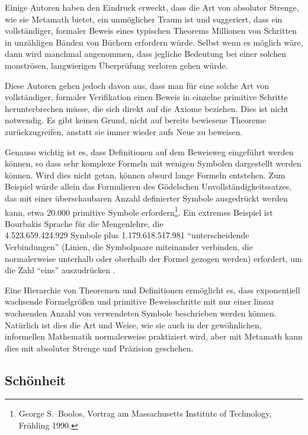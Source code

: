 Einige Autoren haben den Eindruck erweckt, dass die Art von absoluter Strenge, wie sie Metamath bietet, ein unmöglicher Traum ist und suggeriert, dass ein vollständiger, formaler Beweis eines typischen Theorems Millionen von Schritten in unzähligen Bänden von Büchern erfordern würde.  Selbst wenn es möglich wäre, dann wird manchmal angenommen, dass jegliche Bedeutung bei einer solchen monströsen, langwierigen Überprüfung verloren gehen würde.

Diese Autoren gehen jedoch davon aus, dass man für eine solche Art von vollständiger, formaler Verifikation einen Beweis in einzelne primitive Schritte herunterbrechen müsse, die sich direkt auf die Axiome beziehen.  Dies ist nicht notwendig.  Es gibt keinen Grund, nicht auf bereits bewiesene Theoreme zurückzugreifen, anstatt sie immer wieder aufs Neue zu beweisen.

Genauso wichtig ist es, dass Definitionen auf dem Beweisweg eingeführt werden können, so dass sehr komplexe Formeln mit wenigen Symbolen dargestellt werden können. Wird dies nicht getan, können absurd lange Formeln entstehen.  Zum Beispiel würde allein das Formulieren des Gödelschen Unvollständigkeitssatzes, das mit einer überschaubaren Anzahl definierter Symbole ausgedrückt werden kann, etwa 20.000 primitive Symbole erfordern\footnote{George S.\ Boolos, Vortrag am Massachusetts Institute of Technology, Frühling 1990.}.
Ein extremes Beispiel ist Bourbakis\label{bourbaki} Sprache für die Mengenlehre, die \\ 4.523.659.424.929 Symbole plus 1.179.618.517.981 "`unterscheidende Verbin\-dun\-gen"' (Linien, die Symbolpaare miteinander verbinden, die normalerweise unterhalb oder oberhalb der Formel gezogen werden) erfordert, um die Zahl "`eins"' auszudrücken \cite{Mathias}.

Eine Hierarchie von Theoremen und Definitionen ermöglicht es, dass exponentiell wachsende Formelgrößen und primitive Beweisschritte mit nur einer linear wachsenden Anzahl von verwendeten Symbole beschrieben werden können.  Natürlich ist dies die Art und Weise, wie sie auch in der gewöhnlichen, informellen Mathematik normalerweise praktiziert wird, aber mit Metamath kann dies mit absoluter Strenge und Präzision geschehen.

\subsection{Schönheit}


